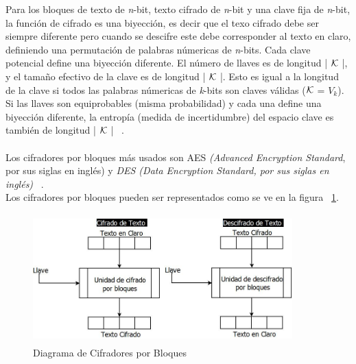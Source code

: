 Para los bloques de texto de \textit{n}-bit, texto cifrado de \textit{n}-bit y una clave fija de \textit{n}-bit, la función de cifrado es
una biyección, es decir que el texo cifrado debe ser siempre diferente pero cuando se descifre este debe corresponder al texto en claro, definiendo una permutación de palabras númericas de \textit{n}-bits. Cada clave potencial define una biyección diferente. El número de llaves es de longitud | $\cal{K}$ |, y el tamaño efectivo de la clave es de longitud | $\cal{K}$ |. Esto es igual a la longitud de la clave si todos las palabras númericas de \textit{k}-bits son claves válidas ($\cal{K}$ = $V_{\textit{k}}$). Si las llaves son equiprobables (misma probabilidad) y cada una define una biyección diferente, la entropía (medida de incertidumbre) del espacio clave es también de longitud | $\cal K$ | ~\cite{menezes}. \\ \\


Los cifradores por bloques más usados son AES \textit{(Advanced Encryption Standard}, por sus 
siglas en ingl\'es) y \textit{DES (Data Encryption Standard, por sus siglas en inglés)} ~\cite{bloques}.\\ 

Los cifradores por bloques pueden ser representados como se ve en la figura ~\ref{fig:2-5-1}.

\begin{figure}[H]
\centering
	\includegraphics[width=10cm, height=5cm]{./images/CifradoBloques.jpeg}
	\caption{Diagrama de Cifradores por Bloques}
	\label{fig:2-5-1}
\end{figure}


